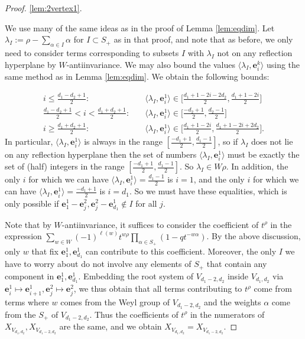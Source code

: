 \documentclass[12pt]{article}
\renewcommand{\b}[1]{\textbf{#1}}
\theoremstyle{definition}
\theoremstyle{remark}
\begin{document}
\begin{proof}
    \ref{lem:2vertex1}.
    
    We use many of the same ideas as in the proof of Lemma \ref{lem:eqdim}. Let $\lambda_I:=\rho-\sum_{\alpha\in I}\alpha$ for $I\subset S_+$ as in that proof, and note that as before, we only need to consider terms corresponding to subsets $I$ with $\lambda_I$ not on any reflection hyperplane by $W$-antiinvariance. We may also bound the values $\langle\lambda_I,\b{e}_i^k\rangle$ using the same method as in Lemma \ref{lem:eqdim}. We obtain the following bounds:
    
    \begin{align*}
        i\leq\frac{d_1-d_2+1}{2}:\quad&\langle\lambda_I,\b{e}_i^1\rangle\in\Big[\frac{d_1+1-2i-2d_2}{2},\frac{d_1+1-2i}{2}\Big]\\
        \frac{d_1-d_2+1}{2}<i<\frac{d_1+d_2+1}{2}:\quad&\langle\lambda_I,\b{e}_i^1\rangle\in\Big[\frac{-d_2+1}{2},\frac{d_2-1}{2}\Big]\\
        i\geq\frac{d_1+d_2+1}{2}:\quad&\langle\lambda_I,\b{e}_i^1\rangle\in\Big[\frac{d_1+1-2i}{2},\frac{d_1+1-2i+2d_2}{2}\Big].
    \end{align*}
    In particular, $\langle\lambda_I,\b{e}_i^1\rangle$ is always in the range $[\frac{-d_1+1}{2},\frac{d_1-1}{2}]$, so if $\lambda_I$ does not lie on any reflection hyperplane then the set of numbers $\langle\lambda_I,\b{e}_i^1\rangle$ must be exactly the set of (half) integers in the range $[\frac{-d_1+1}{2},\frac{d_1-1}{2}]$. So $\lambda_I\in W\rho$. In addition, the only $i$ for which we can have $\langle\lambda_I,\b{e}_i^1\rangle=\frac{d_1-1}{2}$ is $i=1$, and the only $i$ for which we can have $\langle\lambda_I,\b{e}_i^1\rangle=\frac{-d_1+1}{2}$ is $i=d_1$. So we must have these equalities, which is only possible if $\b{e}_1^1-\b{e}_j^2,\b{e}_j^2-\b{e}_{d_1}^1\not\in I$ for all $j$. 

    Note that by $W$-antiinvariance, it suffices to consider the coefficient of $t^\rho$ in the expression $\sum_{w\in W}(-1)^{\ell(w)}t^{w\rho}\prod_{\alpha\in S_+}(1-qt^{-w\alpha})$. By the above discussion, only $w$ that fix $\b{e}_1^1,\b{e}_{d_1}^1$ can contribute to this coefficient. Moreover, the only $I$ we have to worry about do not involve any elements of $S_+$ that contain any component in $\b{e}_1^1,\b{e}_{d_1}^1$. Embedding the root system of $V_{d_1-2,d_2}$ inside $V_{d_1,d_2}$ via $\b{e}_i^1\mapsto\b{e}_{i+1}^1,\b{e}_j^2\mapsto\b{e}_j^2$, we thus obtain that all terms contributing to $t^\rho$ come from terms where $w$ comes from the Weyl group of $V_{d_1-2,d_2}$ and the weights $\alpha$ come from the $S_+$ of $V_{d_1-2,d_2}$. Thus the coefficients of $t^\rho$ in the numerators of $X_{V_{d_1,d_2}},X_{V_{d_1-2,d_2}}$ are the same, and we obtain $X_{V_{d_1,d_2}}=X_{V_{d_1-2,d_2}}$.


\end{proof}
\end{document}
